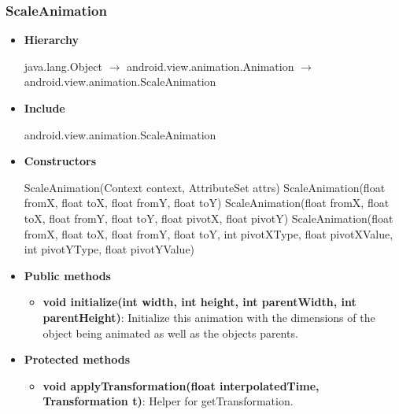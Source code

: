 \documentclass{report}
\begin{document}
    \subsubsection{ScaleAnimation}
    \begin{itemize}
        \item \textbf{Hierarchy}
            \begin{center}
                java.lang.Object $\to$	android.view.animation.Animation $\to$	android.view.animation.ScaleAnimation
            \end{center}
        \item \textbf{Include}
            \bigbreak \noindent 
            \begin{javacode}
                android.view.animation.ScaleAnimation
            \end{javacode}
        \item \textbf{Constructors}
            \bigbreak \noindent 
            \begin{javacode}
                ScaleAnimation(Context context, AttributeSet attrs)
                ScaleAnimation(float fromX, float toX, float fromY, float toY)
                ScaleAnimation(float fromX, float toX, float fromY, float toY, float pivotX, float pivotY)
                ScaleAnimation(float fromX, float toX, float fromY, float toY, int pivotXType, float pivotXValue, int pivotYType, float pivotYValue)
            \end{javacode}
        \item \textbf{Public methods}
            \begin{itemize}
                \item \textbf{void	initialize(int width, int height, int parentWidth, int parentHeight)}: Initialize this animation with the dimensions of the object being animated as well as the objects parents.
            \end{itemize}
        \item \textbf{Protected methods}
            \begin{itemize}
                \item \textbf{void	applyTransformation(float interpolatedTime, Transformation t)}: Helper for getTransformation.
            \end{itemize}

    \end{itemize}

    \pagebreak 
\end{document}
